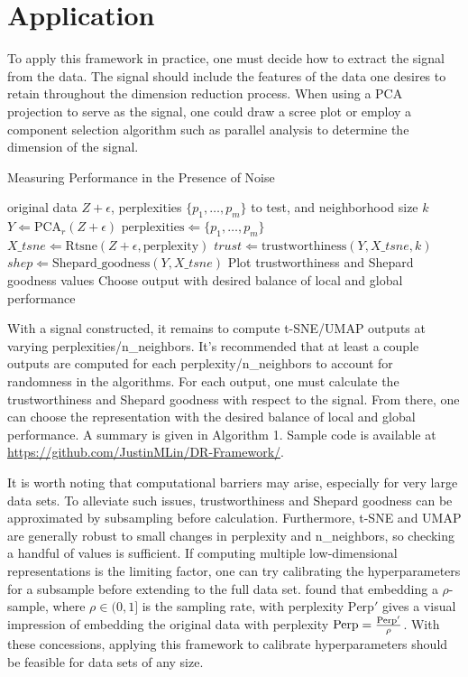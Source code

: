\documentclass{article}
\begin{document}
\section{Application}
To apply this framework in practice, one must decide how to extract the signal from the data. The signal should include the features of the data one desires to retain throughout the dimension reduction process. When using a PCA projection to serve as the signal, one could draw a scree plot or employ a component selection algorithm such as parallel analysis \cite{parallel analysis} to determine the dimension of the signal.

\begin{algorithm}[b]
\caption{Measuring Performance in the Presence of Noise}\label{algo1}
\begin{algorithmic}[1]
\Require original data $Z + \epsilon$, perplexities $\{p_1, \hdots, p_m\}$ to test, and neighborhood size $k$
\State $Y \Leftarrow \textrm{PCA}_r(Z + \epsilon)$
\State $\textrm{perplexities} \Leftarrow \{p_1, \hdots, p_m\}$
	\Loop
		\State $X\_tsne \Leftarrow \textrm{Rtsne}(Z + \epsilon, \textrm{perplexity})$
		\State $trust \Leftarrow \textrm{trustworthiness}(Y, X\_tsne, k)$
		\State $shep \Leftarrow \textrm{Shepard\_goodness}(Y, X\_tsne)$
	\EndLoop
\EndFor
\State Plot trustworthiness and Shepard goodness values
\State Choose output with desired balance of local and global performance
\end{algorithmic}
\end{algorithm}

With a signal constructed, it remains to compute t-SNE/UMAP outputs at varying perplexities/n\_neighbors. It's recommended that at least a couple outputs are computed for each perplexity/n\_neighbors to account for randomness in the algorithms. For each output, one must calculate the trustworthiness and Shepard goodness with respect to the signal. From there, one can choose the representation with the desired balance of local and global performance. A summary is given in Algorithm 1. Sample code is available at \url{https://github.com/JustinMLin/DR-Framework/}.

It is worth noting that computational barriers may arise, especially for very large data sets. To alleviate such issues, trustworthiness and Shepard goodness can be approximated by subsampling before calculation. Furthermore, t-SNE and UMAP are generally robust to small changes in perplexity and n\_neighbors, so checking a handful of values is sufficient. If computing multiple low-dimensional representations is the limiting factor, one can try calibrating the hyperparameters for a subsample before extending to the full data set. \cite{subsample t-SNE} found that embedding a $\rho$-sample, where $\rho \in (0,1]$ is the sampling rate, with perplexity $\textrm{Perp}'$ gives a visual impression of embedding the original data with perplexity $\textrm{\textrm{Perp}} = \frac{\textrm{Perp}'}{\rho}$. With these concessions, applying this framework to calibrate hyperparameters should be feasible for data sets of any size.
\end{document}
